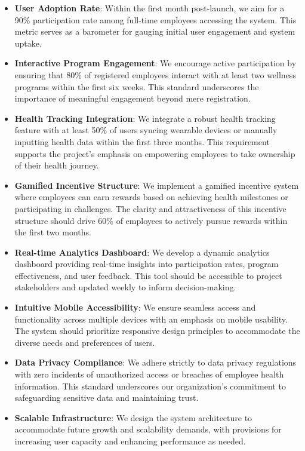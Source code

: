 \begin{itemize}
    \item \textbf{User Adoption Rate}: Within the first month post-launch, we aim for a 90\% participation rate among full-time employees accessing the system. This metric serves as a barometer for gauging initial user engagement and system uptake.
    \item \textbf{Interactive Program Engagement}: We encourage active participation by ensuring that 80\% of registered employees interact with at least two wellness programs within the first six weeks. This standard underscores the importance of meaningful engagement beyond mere registration.
    \item \textbf{Health Tracking Integration}: We integrate a robust health tracking feature with at least 50\% of users syncing wearable devices or manually inputting health data within the first three months. This requirement supports the project's emphasis on empowering employees to take ownership of their health journey.
    \item \textbf{Gamified Incentive Structure}: We implement a gamified incentive system where employees can earn rewards based on achieving health milestones or participating in challenges. The clarity and attractiveness of this incentive structure should drive 60\% of employees to actively pursue rewards within the first two months.
    \item \textbf{Real-time Analytics Dashboard}: We develop a dynamic analytics dashboard providing real-time insights into participation rates, program effectiveness, and user feedback. This tool should be accessible to project stakeholders and updated weekly to inform decision-making.
    \item \textbf{Intuitive Mobile Accessibility}: We ensure seamless access and functionality across multiple devices with an emphasis on mobile usability. The system should prioritize responsive design principles to accommodate the diverse needs and preferences of users.
    \item \textbf{Data Privacy Compliance}: We adhere strictly to data privacy regulations with zero incidents of unauthorized access or breaches of employee health information. This standard underscores our organization's commitment to safeguarding sensitive data and maintaining trust.
    \item \textbf{Scalable Infrastructure}: We design the system architecture to accommodate future growth and scalability demands, with provisions for increasing user capacity and enhancing performance as needed.

\end{itemize}

